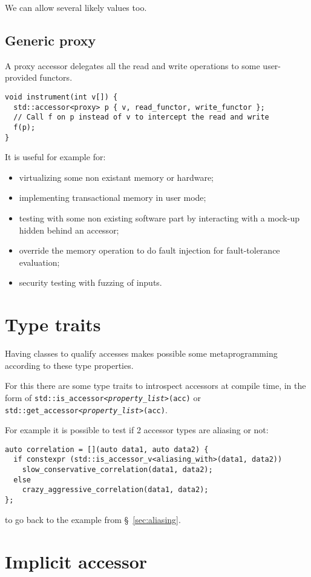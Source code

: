 \documentclass[a4paper]{article}
\begin{document}
We can allow several likely values too.


\subsection{Generic proxy}
\label{sec:generic-proxy}

A proxy accessor delegates all the read and write operations to some
user-provided functors.
\begin{lstlisting}
void instrument(int v[]) {
  std::accessor<proxy> p { v, read_functor, write_functor };
  // Call f on p instead of v to intercept the read and write
  f(p);
}
\end{lstlisting}
It is useful for example for:
\begin{itemize}
\item virtualizing some non existant memory or hardware;
\item implementing transactional memory in user mode;
\item testing with some non existing software part by interacting with
  a mock-up hidden behind an accessor;
\item override the memory operation to do fault injection for
  fault-tolerance evaluation;
\item security testing with fuzzing of inputs.
\end{itemize}


\section{Type traits}
\label{sec:type-traits}

Having classes to qualify accesses makes possible some metaprogramming
according to these type properties.

For this there are some type traits to introspect accessors at compile
time, in the form of
\texttt{std::is\_accessor<\emph{property\_list}>(acc)} or
\texttt{std::get\_accessor<\emph{property\_list}>(acc)}.

For example it is possible to test if 2 accessor types are aliasing or
not:
\begin{lstlisting}
auto correlation = [](auto data1, auto data2) {
  if constexpr (std::is_accessor_v<aliasing_with>(data1, data2))
    slow_conservative_correlation(data1, data2);
  else
    crazy_aggressive_correlation(data1, data2);
};
\end{lstlisting}
to go back to the example from \S~\ref{sec:aliasing}.


\section{Implicit accessor}
\label{sec:implicit-accessor}
\end{document}
